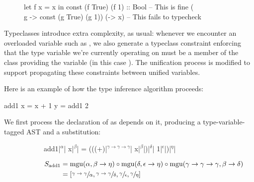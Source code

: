 \documentclass[dissertation.tex]{subfiles}
\begin{document}
{{{            \begin{figure}[h]
            \begin{haskellfigure}
            let f x = x in const (f True) (f 1) :: Bool -- This is fine
            (\\g -> const (g True) (g 1)) (\x -> x)     -- This fails to typecheck
            \end{haskellfigure}
            \caption{}
            \label{code:polymorphic-let}
            \end{figure}
            
            Typeclasses introduce extra complexity, as usual: whenever we encounter an overloaded variable such as
            \haskell{+}, we also generate a typeclass constraint enforcing that the type variable we're currently
            operating on must be a member of the class providing the variable (in this case ). The
            unification process is modified to support propagating these constraints between unified variables.

            Here is an example of how the type inference algorithm proceeds:


            \begin{haskellfigure}
            add1 x = x + 1
            y = add1 2
            \end{haskellfigure}

            We first process the declaration of  as  depends on it, producing a
            type-variable-tagged AST and a substitution:

            \begin{figure}[H]
            \begin{subfigure}[c]{\textwidth}
                \centering
                \begin{haskellfigure}
                add1|\(^\alpha\)| x|\(^\beta\)| = (((+)|\(^{\gamma \rightarrow \gamma \rightarrow \gamma}\)| x|\(^\beta\)|)|\(^\delta\)| 1|\(^\epsilon\)|)|\(^\eta\)|
                \end{haskellfigure}
            \end{subfigure}

            \begin{subfigure}[c]{\textwidth}
                \centering
                \begin{equation*}
                \begin{split}
                    S_\text{add1} & = \text{mgu}(\alpha, \beta \rightarrow \eta) \circ \text{mgu}(\delta, \epsilon \rightarrow \eta) \circ \text{mgu}(\gamma\rightarrow\gamma\rightarrow\gamma, \beta \rightarrow \delta) \\
                                  & = [\sfrac{\gamma\rightarrow\gamma}{\alpha}, \sfrac{\gamma\rightarrow\gamma}{\delta}, \sfrac{\gamma}{\epsilon}, \sfrac{\gamma}{\eta}]
                \end{split}
                \end{equation*}
            \end{subfigure}
            \end{figure}

}}}
\end{document}
